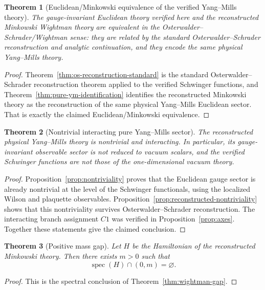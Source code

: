\documentclass[11pt]{article}
\newtheorem{theorem}{Theorem}[section]
\theoremstyle{definition}
\theoremstyle{remark}
\newcommand{\spec}{\operatorname{spec}}
\begin{document}
\begin{theorem}[Euclidean/Minkowski equivalence of the verified Yang--Mills theory]
\label{thm:euclidean-minkowski-equivalence}
The gauge-invariant Euclidean theory verified here and the
reconstructed Minkowski Wightman theory are equivalent in the
Osterwalder--Schrader/Wightman sense: they are related by the standard
Osterwalder--Schrader reconstruction and analytic continuation, and they encode
the same physical Yang--Mills theory.
\end{theorem}

\begin{proof}
Theorem~\ref{thm:os-reconstruction-standard} is the standard
Osterwalder--Schrader reconstruction theorem applied to the verified Schwinger
functions, and Theorem~\ref{thm:pure-ym-identification} identifies the
reconstructed Minkowski theory as the reconstruction of the same physical
Yang--Mills Euclidean sector.  That is exactly the claimed
Euclidean/Minkowski equivalence.
\end{proof}

\begin{theorem}[Nontrivial interacting pure Yang--Mills sector]
\label{thm:nontrivial-interacting-ym}
The reconstructed physical Yang--Mills theory is nontrivial and interacting.
In particular, its gauge-invariant observable sector is not reduced to vacuum
scalars, and the verified Schwinger functions are not those of the
one-dimensional vacuum theory.
\end{theorem}

\begin{proof}
Proposition~\ref{prop:nontriviality} proves that the Euclidean gauge sector is
already nontrivial at the level of the Schwinger functionals, using the
localized Wilson and plaquette observables.  Proposition~\ref{prop:reconstructed-nontriviality}
shows that this nontriviality survives Osterwalder--Schrader reconstruction.
The interacting branch assignment \(C1\) was verified in Proposition~\ref{prop:axes}.
Together these statements give the claimed conclusion.
\end{proof}

\begin{theorem}[Positive mass gap]
\label{thm:positive-gap}
Let $H$ be the Hamiltonian of the reconstructed Minkowski theory.
Then there exists $m>0$ such that
\[
\spec(H)\cap(0,m)=\varnothing.
\]
\end{theorem}

\begin{proof}
This is the spectral conclusion of Theorem~\ref{thm:wightman-gap}.
\end{proof}
\end{document}
